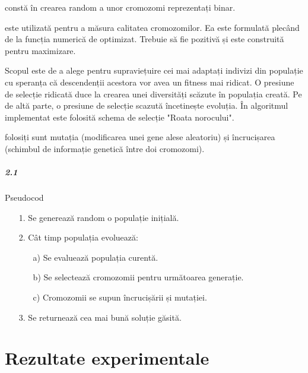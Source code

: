 \documentclass[paper=a4, fontsize=11pt]{scrartcl}
\begin{document}
\underline{} constă în crearea random a unor cromozomi reprezentați binar. 

\underline{} este utilizată pentru a măsura calitatea cromozomilor. Ea este formulată plecând de la funcția numerică de optimizat. Trebuie să fie pozitivă și este construită pentru maximizare.

Scopul \underline{} este de a alege pentru supraviețuire cei mai adaptați indivizi din populație cu speranța că descendenții acestora vor avea un fitness mai ridicat.
O presiune de selecție ridicată duce la crearea unei diversități scăzute în populația creată.
Pe de altă parte, o presiune de selecție scazută încetinește evoluția.
În algoritmul implementat este folosită schema de selecție "Roata norocului".

\underline{} folosiți sunt mutația (modificarea unei gene alese aleatoriu) și încrucișarea (schimbul de informație genetică între doi cromozomi).

\subparagraph{2.1}
Pseudocod

\begin{enumerate}
    \itemsep0em
    \item[1.] Se generează random o populație inițială.
    \item[2.] Cât timp populația evoluează:
    \begin{enumerate}
        \item[a)] Se evaluează populația curentă.
        \item[b)] Se selectează cromozomii pentru următoarea generație.
        \item[c)] Cromozomii se supun încrucișării și mutației.
    \end{enumerate} 
    \item[3.] Se returnează cea mai bună soluție găsită.
\end{enumerate}

\vspace{40mm}
\section{Rezultate experimentale}
\end{document}
